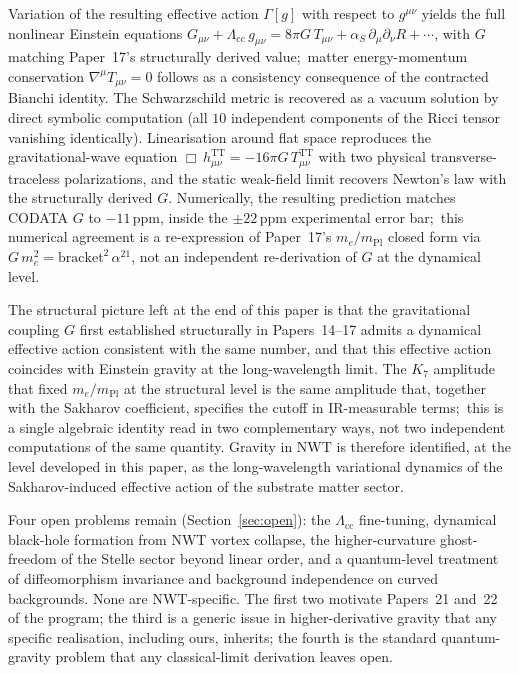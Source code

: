 \documentclass[11pt]{article}
\newcommand{\mPl}{m_{\mathrm{Pl}}}
\newcommand{\me}{m_e}
\begin{document}
Variation of the resulting effective action $\Gamma[g]$ with
respect to $g^{\mu\nu}$ yields the full nonlinear Einstein
equations
$G_{\mu\nu} + \Lambda_{\mathrm{cc}}\,g_{\mu\nu} = 8\pi G\,T_{\mu\nu}
+ \alpha_S\,\partial_\mu\partial_\nu R + \cdots$,
with $G$ matching Paper~17's structurally derived value;\ matter
energy-momentum conservation $\nabla^\mu T_{\mu\nu} = 0$ follows
as a consistency consequence of the contracted Bianchi identity.
The Schwarzschild metric is recovered as a vacuum solution by
direct symbolic computation (all $10$ independent components of
the Ricci tensor vanishing identically).  Linearisation around
flat space reproduces the gravitational-wave equation
$\Box\,h^{\mathrm{TT}}_{\mu\nu} = -16\pi G\,T^{\mathrm{TT}}_{\mu\nu}$
with two physical transverse-traceless polarizations, and the
static weak-field limit recovers Newton's law with the
structurally derived $G$.  Numerically, the resulting prediction
matches CODATA $G$ to $-11$\,ppm, inside the $\pm 22$\,ppm
experimental error bar;\ this numerical agreement is a
re-expression of Paper~17's $\me/\mPl$ closed form via
$G\,\me^2 = \mathrm{bracket}^2\,\alpha^{21}$, not an independent
re-derivation of $G$ at the dynamical level.

The structural picture left at the end of this paper is that the
gravitational coupling $G$ first established structurally in
Papers~14--17 admits a dynamical effective action consistent with
the same number, and that this effective action coincides with
Einstein gravity at the long-wavelength limit.  The $K_7$
amplitude that fixed $\me/\mPl$ at the structural level is the
same amplitude that, together with the Sakharov coefficient,
specifies the cutoff in IR-measurable terms;\ this is a single
algebraic identity read in two complementary ways, not two
independent computations of the same quantity.  Gravity in NWT is
therefore identified, at the level developed in this paper, as the
long-wavelength variational dynamics of the Sakharov-induced
effective action of the substrate matter sector.

Four open problems remain (Section~\ref{sec:open}): the
$\Lambda_{\mathrm{cc}}$ fine-tuning, dynamical black-hole formation
from NWT vortex collapse, the higher-curvature ghost-freedom of the
Stelle sector beyond linear order, and a quantum-level treatment of
diffeomorphism invariance and background independence on curved
backgrounds.  None are NWT-specific.  The first two motivate
Papers~21 and~22 of the program; the third is a generic issue in
higher-derivative gravity that any specific realisation, including
ours, inherits; the fourth is the standard quantum-gravity problem
that any classical-limit derivation leaves open.
\end{document}
